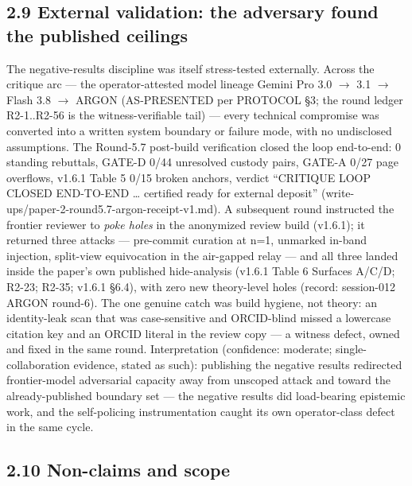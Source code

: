 \documentclass[11pt]{article}
\begin{document}
\subsection{2.9 External validation: the adversary found the published ceilings}\label{external-validation-the-adversary-found-the-published-ceilings}

The negative-results discipline was itself stress-tested externally. Across the critique arc --- the operator-attested model lineage Gemini Pro 3.0 \(\to\) 3.1 \(\to\) Flash 3.8 \(\to\) ARGON (AS-PRESENTED per PROTOCOL \S{}3; the round ledger R2-1..R2-56 is the witness-verifiable tail) --- every technical compromise was converted into a written system boundary or failure mode, with no undisclosed assumptions. The Round-5.7 post-build verification closed the loop end-to-end: 0 standing rebuttals, GATE-D 0/44 unresolved custody pairs, GATE-A 0/27 page overflows, v1.6.1 Table 5 0/15 broken anchors, verdict ``CRITIQUE LOOP CLOSED END-TO-END \ldots{} certified ready for external deposit'' (write-ups/paper-2-round5.7-argon-receipt-v1.md). A subsequent round instructed the frontier reviewer to \emph{poke holes} in the anonymized review build (v1.6.1); it returned three attacks --- pre-commit curation at n=1, unmarked in-band injection, split-view equivocation in the air-gapped relay --- and all three landed inside the paper's own published hide-analysis (v1.6.1 Table 6 Surfaces A/C/D; R2-23; R2-35; v1.6.1 \S{}6.4), with zero new theory-level holes (record: session-012 ARGON round-6). The one genuine catch was build hygiene, not theory: an identity-leak scan that was case-sensitive and ORCID-blind missed a lowercase citation key and an ORCID literal in the review copy --- a witness defect, owned and fixed in the same round. Interpretation (confidence: moderate; single-collaboration evidence, stated as such): publishing the negative results redirected frontier-model adversarial capacity away from unscoped attack and toward the already-published boundary set --- the negative results did load-bearing epistemic work, and the self-policing instrumentation caught its own operator-class defect in the same cycle.

\subsection{2.10 Non-claims and scope}\label{non-claims-and-scope}
\end{document}
